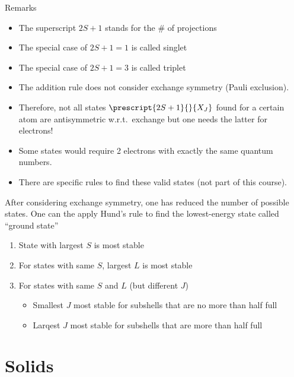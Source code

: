 Remarks
\begin{itemize}
    \item The superscript $2S+1$ stands for the \# of projections
    \item The special case of $2S+1=1$ is called singlet
    \item The special case of $2S+1=3$ is called triplet
\end{itemize}


\begin{itemize}
    \item The addition rule does not consider exchange symmetry (Pauli exclusion).
    \item Therefore, not all states $\prescript{2S+1}{}{X_J}$ found for a certain atom are antisymmetric w.r.t.\ exchange but one needs the latter for electrons!
    \item Some states would require 2 electrons with exactly the same quantum numbers.
    \item There are specific rules to find these valid states (not part of this course).
\end{itemize}


After considering exchange symmetry, one has reduced the number of possible states. One can the apply Hund's rule to find the lowest-energy state called ``ground state''
\begin{enumerate}
    \item State with largest $S$ is most stable
    \item For states with same $S$, largest $L$ is most stable
    \item For states with same $S$ and $L$ (but different $J$)
          \begin{itemize}
              \item Smallest $J$ most stable for subshells that are no more than half full
              \item Larqest $J$ most stable for subshells that are more than half full
          \end{itemize}
\end{enumerate}


\section{Solids}

